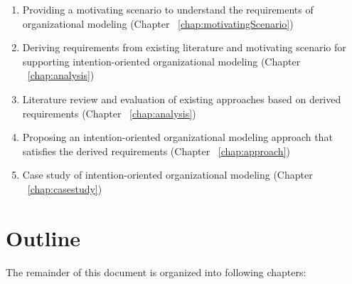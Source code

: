 \begin{enumerate}
	\item Providing a motivating scenario to understand the requirements of organizational modeling (Chapter ~\ref{chap:motivatingScenario})
 	\item Deriving requirements from existing literature and motivating scenario for supporting intention-oriented organizational modeling (Chapter  ~\ref{chap:analysis})
 	\item Literature review and evaluation of existing approaches based on derived requirements (Chapter ~\ref{chap:analysis})
 	\item Proposing an intention-oriented organizational modeling approach that satisfies the derived requirements (Chapter ~\ref{chap:approach})
 	\item Case study of intention-oriented organizational modeling (Chapter ~\ref{chap:casestudy})
\end{enumerate}
 
\section {Outline}
\label{sec:outline}
The remainder of this document is organized into following chapters:

